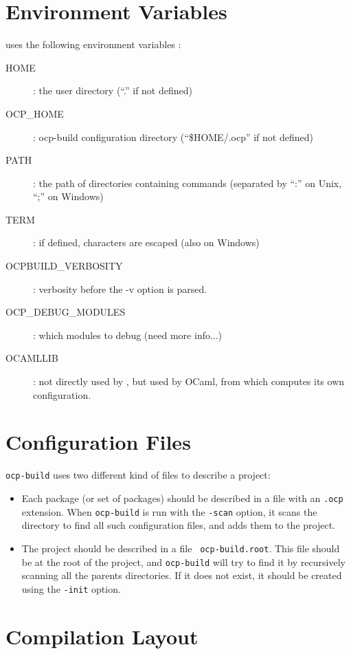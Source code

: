 \section{Environment Variables}

\ocpbuild{} uses the following environment variables :
\begin{description}
\item[HOME] : the user directory (``.'' if not defined)
\item[OCP\_HOME] : ocp-build configuration directory (``\$HOME/.ocp''
  if not defined)
\item[PATH] : the path of directories containing commands (separated
  by ``:'' on Unix, ``;'' on Windows)
\item[TERM] : if defined, characters are escaped (also on Windows)
\item[OCPBUILD\_VERBOSITY] : verbosity before the -v option is parsed.
\item[OCP\_DEBUG\_MODULES] : which modules to debug (need more info...)
\item[OCAMLLIB] : not directly used by \ocpbuild{}, but used by OCaml,
  from which \ocpbuild{} computes its own configuration.
\end{description}

\section{Configuration Files}

 {\tt ocp-build} uses two different kind of files to describe a project:
\begin{itemize}
\item Each package (or set of packages) should be described in a file
  with an {\tt .ocp} extension. When {\tt ocp-build} is run with the
  {\tt -scan} option, it scans the directory to find all such
  configuration files, and adds them to the project.
\item The project should be described in a file {\tt
  ocp-build.root}. This file should be at the root of the project, and
  {\tt ocp-build} will try to find it by recursively scanning all the
  parents directories. If it does not exist, it should be created using
  the {\tt -init} option.
\end{itemize}

\section{Compilation Layout}


